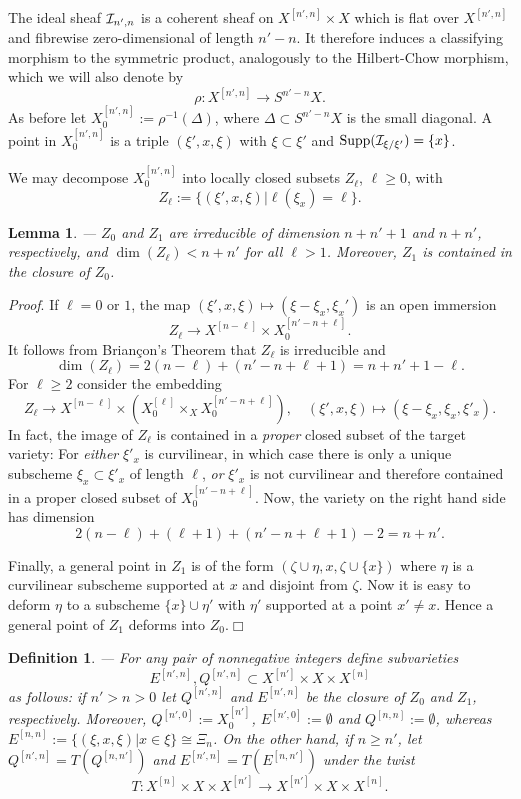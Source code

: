 \documentclass[twoside,11pt]{article}
\newtheorem{lemma}[theorem]{Lemma}
\newtheorem{definition}[theorem]{Definition}
\newcommand{\prf}{{\kursiv Proof}. }
\newcommand{\qed}{\hspace*{\fill}$\Box$\vspace{2ex}}
\newcommand{\kursiv}{\sl}
\newcommand{\ki}{{\cal I}}
\newcommand{\isom}{\cong}
\newcommand{\Supp}{{\rm Supp}}
\newcommand{\lra}{\longrightarrow}
\begin{document}
The ideal sheaf $\ki_{n',n}$ is a coherent sheaf on $X^{[n',n]}\times X$ which
is flat over $X^{[n',n]}$ and fibrewise zero-dimensional of length $n'-n$.
It therefore induces a classifying morphism to the symmetric product, analogously to the Hilbert-Chow morphism, which we will also denote by
$$\rho:X^{[n',n]}\to S^{n'-n}X.$$
As before let $X^{[n',n]}_0:=\rho^{-1}(\Delta)$, where $\Delta\subset S^{n'-n}X$
is the small diagonal. A point in $X^{[n',n]}_0$ is a triple
$(\xi',x,\xi)$ with $\xi\subset\xi'$ and $\Supp(\ki_{\xi/\xi'})=\{x\}$. 

We may decompose $X^{[n',n]}_0$ into locally closed subsets $Z_\ell$, $\ell\geq0$, with
$$Z_\ell:=\{(\xi',x,\xi)|\ell(\xi_x)=\ell\}.$$


\begin{lemma}\label{Z0andZ1}--- $Z_0$ and $Z_1$ are irreducible of dimension $n+n'+1$ and
$n+n'$, respectively, and $\dim(Z_\ell)<n+n'$ for all $\ell>1$. Moreover,
$Z_1$ is contained in the closure of $Z_0$.
\end{lemma}

\prf If $\ell=0$ or $1$,  the map $(\xi',x,\xi)\mapsto (\xi-\xi_x,\xi_x')$
is an open immersion 
$$Z_\ell\lra X^{[n-\ell]}\times X^{[n'-n+\ell]}_0.$$
It follows from Brian\c{c}on's Theorem that $Z_\ell$ is irreducible and 
$$\dim(Z_\ell)=2(n-\ell)+(n'-n+\ell+1)=n+n'+1-\ell.$$
For $\ell\geq 2$ consider the embedding
$$Z_\ell\lra X^{[n-\ell]}\times (X^{[\ell]}_0\times_XX^{[n'-n+\ell]}_0),
\quad(\xi',x,\xi)\mapsto(\xi-\xi_x, \xi_x,\xi'_x).$$
In fact, the image of $Z_\ell$ is contained in a {\em proper} closed subset of
the target variety: For {\em either} $\xi'_x$ is curvilinear, in which
case there is only a unique subscheme $\xi_x\subset \xi'_x$ of length $\ell$,
{\em or} $\xi'_x$ is not curvilinear and therefore contained in a proper
closed subset of $X^{[n'-n+\ell]}_0$. Now, the variety on the right hand side
has dimension $$2(n-\ell)+(\ell+1)+(n'-n+\ell+1)-2=n+n'.$$
 
Finally, a general point in $Z_1$ is of the form 
$(\zeta\cup\eta,x,\zeta\cup\{x\})$
where $\eta$ is a curvilinear subscheme supported at $x$ and 
disjoint from $\zeta$. Now it is easy to deform $\eta$ to a subscheme $\{x\}\cup\eta'$ with $\eta'$ supported at a point $x'\neq x$. Hence
a general point of $Z_1$ deforms into $Z_0$.\qed


\begin{definition}\label{definitionofQ}--- For any pair of nonnegative integers define subvarieties
$$E^{[n',n]},Q^{[n',n]}\subset X^{[n']}\times X\times X^{[n]}$$
as follows: if $n'>n>0$ let $Q^{[n',n]}$ and $E^{[n',n]}$ be the closure of
$Z_0$ and $Z_1$, respectively. Moreover, $Q^{[n',0]}:=X^{[n']}_0$, $E^{[n',0]}:=\emptyset$ and $Q^{[n,n]}:=\emptyset$, whereas $E^{[n,n]}:=\{
(\xi,x,\xi)|x\in\xi\}\isom \Xi_n$. On the other hand, if $n\geq n'$, let
$Q^{[n',n]}=T(Q^{[n,n']})$ and $E^{[n',n]}=T(E^{[n,n']})$ under the twist
$$T:X^{[n]}\times X\times X^{[n']}\to X^{[n']}\times X\times X^{[n]}.$$
\end{definition}
\end{document}
